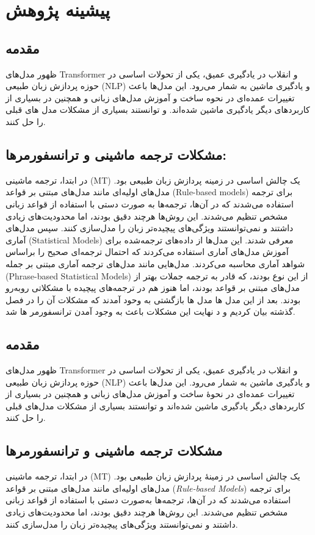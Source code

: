 \chapter{پیشینه پژوهش}

\section{مقدمه}
ظهور مدل‌های Transformer و انقلاب در یادگیری عمیق، یکی از تحولات اساسی در حوزه پردازش زبان طبیعی (NLP) و یادگیری ماشین به شمار می‌رود. این مدل‌ها باعث تغییرات عمده‌ای در نحوه ساخت و آموزش مدل‌های زبانی و همچنین در بسیاری از کاربردهای دیگر یادگیری ماشین شده‌اند. و توانستند بسیاری از مشکلات مدل های قبلی را حل کنند.

\section{مشکلات ترجمه ماشینی و ترانسفورمرها:}
در ابتدا، ترجمه ماشینی (MT) یک چالش اساسی در زمینه پردازش زبان طبیعی بود. مدل‌های اولیه‌ای مانند مدل‌های مبتنی بر قواعد (Rule-based models) برای ترجمه استفاده می‌شدند که در آن‌ها، ترجمه‌ها به صورت دستی با استفاده از قواعد زبانی مشخص تنظیم می‌شدند.
این روش‌ها هرچند دقیق بودند، اما محدودیت‌های زیادی داشتند و نمی‌توانستند ویژگی‌های پیچیده‌تر زبان را مدل‌سازی کنند.
سپس مدل‌های آماری (Statistical Models) معرفی شدند. این مدل‌ها از داده‌های ترجمه‌شده برای آموزش مدل‌های آماری استفاده می‌کردند که احتمال ترجمه‌ای صحیح را براساس شواهد آماری محاسبه می‌کردند. مدل‌هایی مانند مدل‌های ترجمه آماری مبتنی بر جمله (Phrase-based Statistical Models) از این نوع بودند، که قادر به ترجمه جملات بهتر از مدل‌های مبتنی بر قواعد بودند، اما هنوز هم در ترجمه‌های پیچیده با مشکلاتی روبه‌رو بودند.  بعد از این مدل ها مدل ها بازگشتی به وحود آمدند که مشکلات آن را در فصل گذشته بیان کردیم و د نهایت این مشکلات باعث به وجود آمدن ترانسفورمر ها شد.\section{مقدمه}
ظهور مدل‌های Transformer و انقلاب در یادگیری عمیق، یکی از تحولات اساسی در حوزه پردازش زبان طبیعی (NLP) و یادگیری ماشین به شمار می‌رود. این مدل‌ها باعث تغییرات عمده‌ای در نحوهٔ ساخت و آموزش مدل‌های زبانی و همچنین در بسیاری از کاربردهای دیگر یادگیری ماشین شده‌اند و توانستند بسیاری از مشکلات مدل‌های قبلی را حل کنند.

\section{مشکلات ترجمه ماشینی و ترانسفورمرها}
در ابتدا، ترجمه ماشینی (MT) یک چالش اساسی در زمینهٔ پردازش زبان طبیعی بود. مدل‌های اولیه‌ای مانند مدل‌های مبتنی بر قواعد (\textit{Rule-based Models}) برای ترجمه استفاده می‌شدند که در آن‌ها، ترجمه‌ها به‌صورت دستی با استفاده از قواعد زبانی مشخص تنظیم می‌شدند. این روش‌ها هرچند دقیق بودند، اما محدودیت‌های زیادی داشتند و نمی‌توانستند ویژگی‌های پیچیده‌تر زبان را مدل‌سازی کنند.

